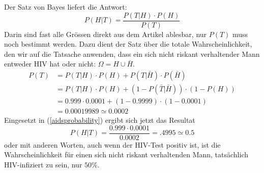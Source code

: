 Der Satz von Bayes liefert die Antwort:
\begin{equation}
P(H|T)=\frac{P(T|H)\cdot P(H)}{P(T)}
\label{aidsprobability}
\end{equation}
Darin sind fast alle Grössen direkt aus dem Artikel ablesbar, nur $P(T)$ muss
noch bestimmt werden.
Dazu dient der Satz über die totale Wahrscheinlichkeit,
den wir auf die Tatsache anwenden, dass ein sich nicht riskant verhaltender
Mann entweder HIV hat oder nicht: $\Omega=H\cup \bar H$.
\begin{align*}
P(T)
&=P(T|H)\cdot P(H)+P(T|\bar H)\cdot P(\bar H)\\
&=P(T|H)\cdot P(H)+(1-P(\bar T|\bar H))\cdot (1 - P(H))\\
&=0.999\cdot 0.0001+(1-0.9999)\cdot(1-0.0001)\\
&=0.00019989\simeq 0.0002
\end{align*}
Eingesetzt in (\ref{aidsprobability}) ergibt sich jetzt das Resultat
\[
P(H|T)=\frac{0.999\cdot 0.0001}{0.0002}=.4995\simeq 0.5
\]
oder mit anderen Worten, auch wenn der HIV-Test positiv ist, ist
die Wahrscheinlichkeit für einen sich nicht riskant verhaltenden Mann,
tatsächlich HIV-infiziert zu sein, nur $50\%$.

